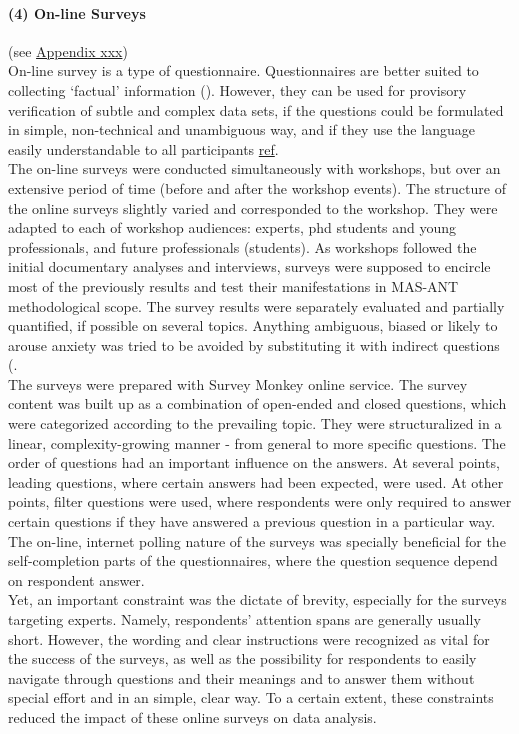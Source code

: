 \documentclass[11pt]{report}
\begin{document}
\paragraph{(4) On-line Surveys}
(see \href{}{Appendix xxx})
\\
On-line survey is a type of questionnaire. Questionnaires  are  better  suited  to  collecting  ‘factual’ information (\cite{Payne and Payne 2004}). However, they can be used for provisory verification of subtle and complex data sets, if the questions could be formulated in simple, non-technical and unambiguous way, and if they use the language easily understandable to all participants \href{}{ref}.
\\
The on-line surveys were conducted simultaneously with workshops, but over an extensive period of time (before and after the workshop events). The structure of the online surveys slightly varied and corresponded to the workshop. They were adapted to each of workshop audiences: experts, phd students and young professionals, and future professionals (students). As workshops followed the initial documentary analyses and interviews, surveys were supposed to encircle most of the previously results and test their manifestations in MAS-ANT methodological scope. The survey results were separately evaluated and partially quantified, if possible on several topics. Anything ambiguous, biased or likely to arouse anxiety was tried to be avoided by substituting it with indirect questions (\cite{Payne and Payne 2004}.
\\
The surveys were prepared with Survey Monkey online service. The survey content was built up as a combination of open-ended and closed questions, which were categorized according to the prevailing topic. They were structuralized in a linear, complexity-growing manner - from general to more specific questions. The order of questions had an important influence on the answers. At several points, leading questions, where certain answers had been expected, were used. At other points, filter questions were used, where respondents were only required to answer certain questions if they have answered a previous question in a particular way. The on-line, internet polling nature of the surveys was specially beneficial for the self-completion parts of the questionnaires, where the question sequence depend on respondent answer. 
\\
Yet, an important constraint was the dictate of brevity, especially for the surveys targeting experts. Namely, respondents’ attention spans are generally usually short. 
However, the wording and clear instructions were recognized as vital for the success of the surveys, as well as the possibility for respondents to easily navigate through questions and their meanings and to answer them without special effort and in an simple, clear way. To a certain extent, these constraints reduced the impact of these online surveys on data analysis.
\end{document}
